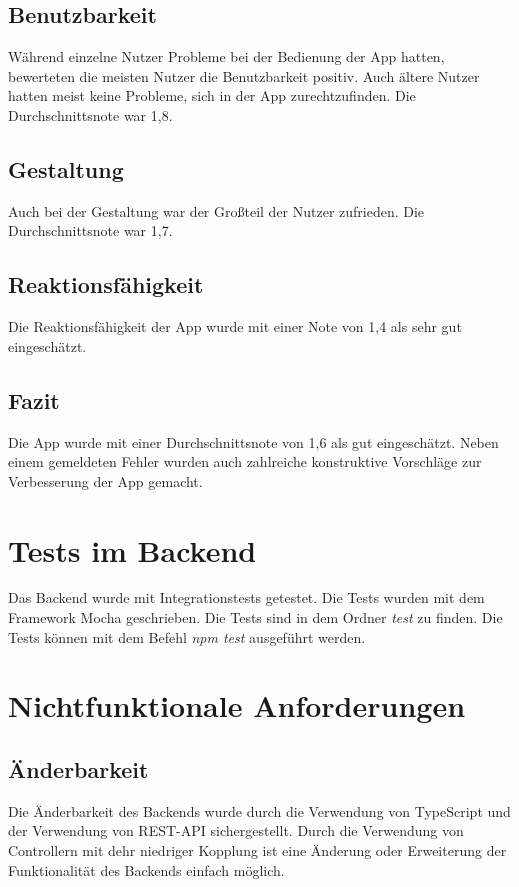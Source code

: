 \documentclass{qualitätssicherungsheft}
\begin{document}
\subsection{Benutzbarkeit}
Während einzelne Nutzer Probleme bei der Bedienung der App hatten, bewerteten die meisten Nutzer die Benutzbarkeit positiv. Auch ältere Nutzer hatten meist keine Probleme, sich in der App zurechtzufinden. Die Durchschnittsnote war 1,8.

\subsection{Gestaltung}
Auch bei der Gestaltung war der Großteil der Nutzer zufrieden. Die Durchschnittsnote war 1,7.

\subsection{Reaktionsfähigkeit}
Die Reaktionsfähigkeit der App wurde mit einer Note von 1,4 als sehr gut eingeschätzt.

\subsection{Fazit}
Die App wurde mit einer Durchschnittsnote von 1,6 als gut eingeschätzt. Neben einem gemeldeten Fehler wurden auch zahlreiche konstruktive Vorschläge zur Verbesserung der App gemacht.

\section{Tests im Backend}
Das Backend wurde mit Integrationstests getestet. Die Tests wurden mit dem Framework Mocha geschrieben. 
Die Tests sind in dem Ordner \textit{test} zu finden. Die Tests können mit dem Befehl \textit{npm test} ausgeführt werden.

\section{Nichtfunktionale Anforderungen}
\subsection{Änderbarkeit}
Die Änderbarkeit des Backends wurde durch die Verwendung von TypeScript und der Verwendung von REST-API sichergestellt.
Durch die Verwendung von Controllern mit dehr niedriger Kopplung ist eine Änderung oder Erweiterung der Funktionalität des Backends einfach möglich.
\end{document}

